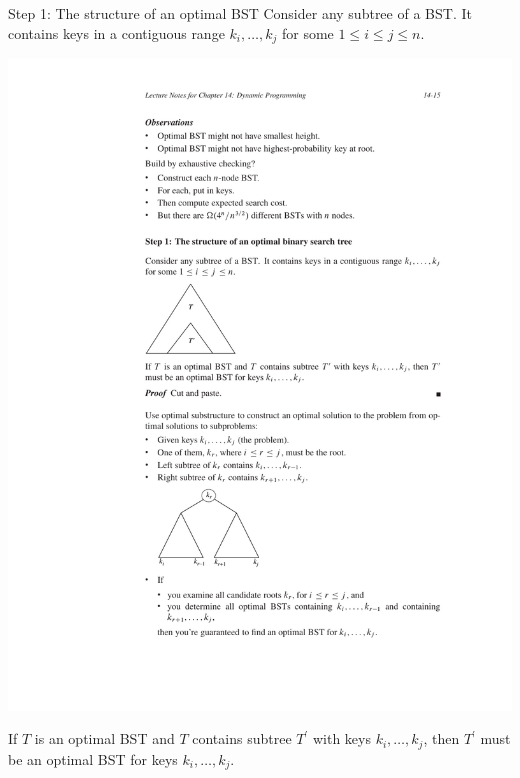 \documentclass{beamer}
\begin{document}
\begin{frame}{Step 1: The structure of an optimal BST}
    Consider any subtree of a BST.  It contains keys in a contiguous range $k_i, \ldots, k_j$ for some $1 \leq i \leq j \leq n$.

    \includegraphics[width=\textwidth, trim={4cm 15cm 4cm 9.5cm}, clip]{figures/BST_step1}

    If $T$ is an optimal BST and $T$ contains subtree $T^\prime$ with keys $k_i, \ldots, k_j$, then $T^\prime$ must be an optimal BST for keys $k_i, \ldots, k_j$.
\end{frame}
\end{document}
